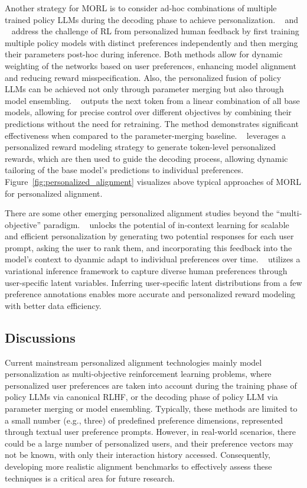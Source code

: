 Another strategy for MORL is to consider ad-hoc combinations of multiple trained policy LLMs during the decoding phase to achieve personalization. ~\citep{jang2023personalized} 
and ~\citep{rame2024rewarded} address the challenge of RL from personalized human feedback by first training multiple policy models with distinct preferences independently and then merging their parameters post-hoc during inference. Both methods allow for dynamic weighting of the networks based on user preferences, enhancing model alignment and reducing reward misspecification.  Also, the personalized fusion of policy LLMs can be achieved not only through parameter merging but also through model ensembling.  ~\citep{shi2024decoding}  outputs the next token from a linear combination of all base models, allowing for precise control over different objectives by combining their predictions without the need for retraining. The method demonstrates significant effectiveness when compared to the parameter-merging baseline. ~\citep{chen2024pad} leverages a personalized reward modeling strategy to generate token-level personalized rewards, which are then used to guide the decoding process, allowing dynamic tailoring of the base model's predictions to individual preferences. 
Figure~\ref{fig:personalized_alignment} visualizes above typical approaches of MORL for personalized alignment.

There are some other emerging personalized alignment studies beyond the “multi-objective” paradigm. ~\citep{lau2024personalized} unlocks the potential of in-context learning for scalable and efficient personalization by generating two potential responses for each user prompt, asking the user to rank them, and incorporating this feedback into the model’s context to dyanmic adapt to individual preferences over time.  ~\citep{poddar2024personalizing} utilizes a variational inference framework to capture diverse human preferences through user-specific latent variables. Inferring user-specific latent distributions from a few preference annotations enables more accurate and personalized reward modeling with better data efficiency.


\subsection{Discussions}
Current mainstream personalized alignment technologies mainly model personalization as multi-objective reinforcement learning problems, where personalized user preferences are taken into account during the training phase of policy LLMs via canonical RLHF, or the decoding phase of policy LLM via parameter merging or model ensembling.  Typically, these methods are limited to a small number (e.g., three) of predefined preference dimensions, represented through textual user preference prompts. However, in real-world scenarios, there could be a large number of personalized users, and their preference vectors may not be known, with only their interaction history accessed. Consequently, developing more realistic alignment benchmarks to effectively assess these techniques is a critical area for future research.
